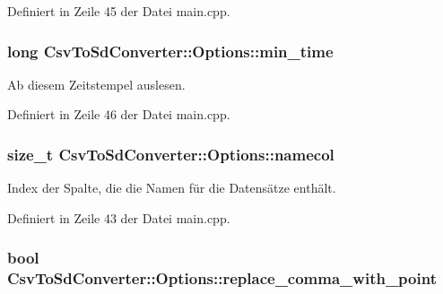 Definiert in Zeile 45 der Datei main.\-cpp.

\hypertarget{structCsvToSdConverter_1_1Options_a076f7b517fccb4a20dd23905f27b8784}{
\subsubsection[{min\-\_\-time}]{\setlength{\rightskip}{0pt plus 5cm}long Csv\-To\-Sd\-Converter\-::\-Options\-::min\-\_\-time}}\label{structCsvToSdConverter_1_1Options_a076f7b517fccb4a20dd23905f27b8784}


Ab diesem Zeitstempel auslesen. 



Definiert in Zeile 46 der Datei main.\-cpp.

\hypertarget{structCsvToSdConverter_1_1Options_a49f5541b593cb8df87547d16a1738dc5}{
\subsubsection[{namecol}]{\setlength{\rightskip}{0pt plus 5cm}size\-\_\-t Csv\-To\-Sd\-Converter\-::\-Options\-::namecol}}\label{structCsvToSdConverter_1_1Options_a49f5541b593cb8df87547d16a1738dc5}


Index der Spalte, die die Namen für die Datensätze enthält. 



Definiert in Zeile 43 der Datei main.\-cpp.

\hypertarget{structCsvToSdConverter_1_1Options_abadbda6c2d744b869b321eb05b3b1ca0}{
\subsubsection[{replace\-\_\-comma\-\_\-with\-\_\-point}]{\setlength{\rightskip}{0pt plus 5cm}bool Csv\-To\-Sd\-Converter\-::\-Options\-::replace\-\_\-comma\-\_\-with\-\_\-point}}\label{structCsvToSdConverter_1_1Options_abadbda6c2d744b869b321eb05b3b1ca0}


